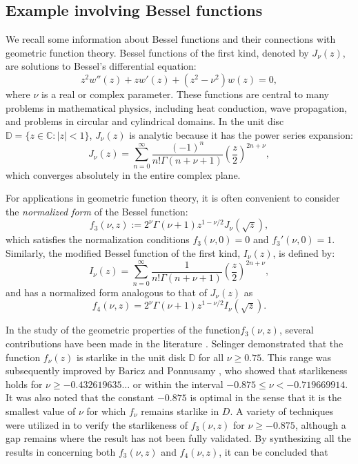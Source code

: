 \documentclass[a4paper,11pt,reqno]{amsart}
\begin{document}
 \subsection{Example involving Bessel functions}\label{sec:Appl-Bessel}
We recall some information about Bessel functions and their connections with geometric function theory. 
Bessel functions of the first kind, denoted by \( J_\nu(z) \), are solutions to Bessel’s differential equation:
\[
z^2 w''(z) + z w'(z) + (z^2 - \nu^2) w(z) = 0,
 \]
 where \(\nu\) is a real or complex parameter. These functions are central to many problems in mathematical physics, including heat conduction, wave propagation, and problems in circular and cylindrical domains. In the unit disc \(\mathbb{D} = \{ z \in \mathbb{C} : |z| < 1 \}\), \( J_\nu(z) \) is analytic because it has the power series expansion:
 \[
 J_\nu(z) = \sum_{n=0}^\infty \frac{(-1)^n}{n! \Gamma(n + \nu + 1)} \left( \frac{z}{2} \right)^{2n + \nu},
 \]
 which converges absolutely in the entire complex plane.

 For applications in geometric function theory, it is often convenient to consider the \emph{normalized form} of the Bessel function:
 \[
 f_3(\nu, z) := 2^\nu \Gamma(\nu + 1) z^{1 - \nu/2} J_\nu(\sqrt{z}),
 \]
 which satisfies the normalization conditions \( f_3(\nu, 0) = 0 \) and \( f_3'(\nu, 0) = 1 \). 
Similarly, the modified Bessel function of the first kind, \( I_\nu(z) \), is defined by:
\[
I_\nu(z) = \sum_{n=0}^\infty \frac{1}{n! \Gamma(n + \nu + 1)} \left( \frac{z}{2} \right)^{2n + \nu},
\]
and has a normalized form analogous to that of \( J_\nu(z) \) as 
\[
 f_4(\nu, z) = 2^\nu \Gamma(\nu + 1) z^{1 - \nu/2} I_\nu(\sqrt{z}).
\]


 In the study of the geometric properties of the function\(  f_3(\nu, z)\), several contributions have been made in the literature \cite{Selinger,Baricz-Ponnusamy-2010,Szasz-Kupan}. Selinger \cite{Selinger} demonstrated that the function \( f_{\nu}(z) \) is starlike in the unit disk \( \mathbb{D} \) for all \( \nu \geq 0.75 \). This range was subsequently improved by Baricz and Ponnusamy \cite{Baricz-Ponnusamy-2010}, who showed that starlikeness holds for \( \nu \geq -0.432619635\ldots \) or within the interval \( -0.875 \leq \nu < -0.719669914 \). It was also noted that the constant \( -0.875 \) is optimal in the sense that it is the smallest value of \( \nu \) for which \( f_{\nu} \) remains starlike in \( D \). A variety of techniques were utilized in \cite{Baricz-Ponnusamy-2010} to verify the starlikeness of \(  f_3(\nu, z) \) for \( \nu \geq -0.875 \), although a gap remains where the result has not been fully validated. By synthesizing all the results in \cite{Baricz-Ponnusamy-2010} concerning both \(  f_3(\nu, z) \) and \(  f_4(\nu, z) \), it can be concluded that 
\end{document}
